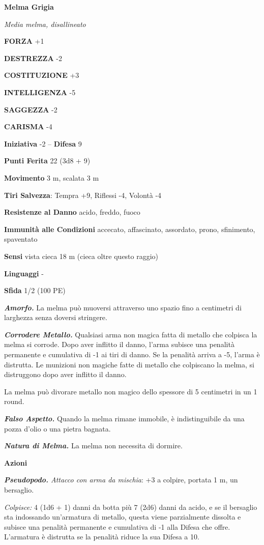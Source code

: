 \begin{multicols}{2}
\medskip{}\textbf{Melma Grigia}

\emph{Media melma, disallineato}

\textbf{FORZA} +1

\textbf{DESTREZZA} -2

\textbf{COSTITUZIONE} +3

\textbf{INTELLIGENZA} -5

\textbf{SAGGEZZA} -2

\textbf{CARISMA} -4

\textbf{Iniziativa} -2 -- \textbf{Difesa} 9

\textbf{Punti Ferita} 22 (3d8 + 9)

\textbf{Movimento} 3 m, scalata 3 m

\textbf{Tiri Salvezza}: Tempra +9, Riflessi -4, Volontà -4

\textbf{Resistenze al Danno} acido, freddo, fuoco

\textbf{Immunità alle Condizioni} accecato, affascinato, assordato,
prono, sfinimento, spaventato

\textbf{Sensi} vista cieca 18 m (cieca oltre questo raggio)

\textbf{Linguaggi} -

\textbf{Sfida} 1/2 (100 PE)

\emph{\textbf{Amorfo.}} La melma può muoversi attraverso uno spazio fino a  centimetri di larghezza senza doversi stringere.

\emph{\textbf{Corrodere Metallo.}} Qualsiasi arma non magica fatta di metallo che colpisca la melma si corrode. Dopo aver inflitto il danno, l'arma subisce una penalità permanente e cumulativa di -1 ai tiri di danno. Se la penalità arriva a -5, l'arma è distrutta. Le munizioni non magiche fatte di metallo che colpiscano la melma, si distruggono dopo aver inflitto il danno.

La melma può divorare metallo non magico dello spessore di 5 centimetri in un 1 round.

\emph{\textbf{Falso Aspetto.}} Quando la melma rimane immobile, è indistinguibile da una pozza d'olio o una pietra bagnata.

\emph{\textbf{Natura di Melma.}} La melma non necessita di dormire.

\textbf{Azioni}

\emph{\textbf{Pseudopodo.} Attacco con arma da mischia}: +3 a colpire, portata 1 m, un bersaglio.

\emph{Colpisce:} 4 (1d6 + 1) danni da botta più 7 (2d6) danni da acido, e se il bersaglio sta indossando un'armatura di metallo, questa viene parzialmente dissolta e subisce una penalità permanente e cumulativa di -1 alla Difesa che offre. L'armatura è distrutta se la penalità riduce la sua Difesa a 10.


\end{multicols}
